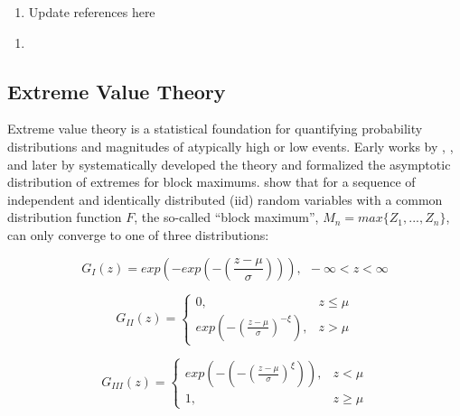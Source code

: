 \begin{enumerate}
    \item Update references here
\end{enumerate}


\begin{enumerate}
    \item \cite{babakhani2014geostatistical}
\end{enumerate}

\subsection{Extreme Value Theory}
\label{subsec:01evt}

Extreme value theory is a statistical foundation for quantifying probability distributions and magnitudes of atypically high or low events. Early works by \cite{frechet1927loi}, \cite{fisher1928limiting}, \cite{mises1936distribution} and later by \cite{gnedenko1943distribution}  systematically developed the theory and formalized the asymptotic distribution of extremes for block maximums. \cite{fisher1928limiting} show that for a sequence of independent and identically distributed (iid) random variables with a common distribution function $F$, the so-called ``block maximum'', $M_n = max\{Z_1,...,Z_n\}$, can only converge to one of three distributions:

\begin{equation}
    G_{I}(z) = exp\left(-exp\left(-\left(\frac{z-\mu}{\sigma}\right)\right)\right), \ \ -\infty < z < \infty
    \label{eq:1}
\end{equation}

\begin{equation}
    G_{II}(z) =
    \begin{cases}
        0,                                                           & z \leq \mu \\
        exp\left(-\left( \frac{z-\mu}{\sigma} \right)^{-\xi}\right), & z > \mu
    \end{cases}
    \label{eq:2}
\end{equation}

\begin{equation}
    G_{III}(z) =
    \begin{cases}
        exp\left(-\left( -\left(\frac{z-\mu}{\sigma} \right)^{\xi} \right) \right), & z < \mu    \\
        1,                                                                          & z \geq \mu
    \end{cases}
    \label{eq:3}
\end{equation}


